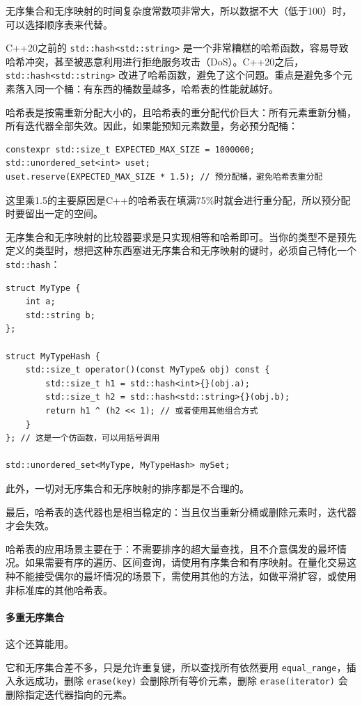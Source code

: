 无序集合和无序映射的时间复杂度常数项非常大，所以数据不大（低于100）时，可以选择顺序表来代替。

C++20之前的 \verb|std::hash<std::string>| 是一个非常糟糕的哈希函数，容易导致哈希冲突，甚至被恶意利用进行拒绝服务攻击（DoS）。C++20之后，\verb|std::hash<std::string>| 改进了哈希函数，避免了这个问题。重点是避免多个元素落入同一个桶：有东西的桶数量越多，哈希表的性能就越好。

哈希表是按需重新分配大小的，且哈希表的重分配代价巨大：所有元素重新分桶，所有迭代器全部失效。因此，如果能预知元素数量，务必预分配桶：
\begin{verbatim}
constexpr std::size_t EXPECTED_MAX_SIZE = 1000000;
std::unordered_set<int> uset;
uset.reserve(EXPECTED_MAX_SIZE * 1.5); // 预分配桶，避免哈希表重分配
\end{verbatim}
这里乘1.5的主要原因是C++的哈希表在填满75\%时就会进行重分配，所以预分配时要留出一定的空间。

无序集合和无序映射的比较器要求是只实现相等和哈希即可。当你的类型不是预先定义的类型时，想把这种东西塞进无序集合和无序映射的键时，必须自己特化一个 \verb|std::hash|：
\begin{verbatim}
struct MyType {
    int a;
    std::string b;
};

struct MyTypeHash {
    std::size_t operator()(const MyType& obj) const {
        std::size_t h1 = std::hash<int>{}(obj.a);
        std::size_t h2 = std::hash<std::string>{}(obj.b);
        return h1 ^ (h2 << 1); // 或者使用其他组合方式
    }
}; // 这是一个仿函数，可以用括号调用

std::unordered_set<MyType, MyTypeHash> mySet;
\end{verbatim}
此外，一切对无序集合和无序映射的排序都是不合理的。

最后，哈希表的迭代器也是相当稳定的：当且仅当重新分桶或删除元素时，迭代器才会失效。

哈希表的应用场景主要在于：不需要排序的超大量查找，且不介意偶发的最坏情况。如果需要有序的遍历、区间查询，请使用有序集合和有序映射。在量化交易这种不能接受偶尔的最坏情况的场景下，需使用其他的方法，如做平滑扩容，或使用非标准库的其他哈希表。

\paragraph{多重无序集合} 这个还算能用。

它和无序集合差不多，只是允许重复键，所以查找所有依然要用 \verb|equal_range|，插入永远成功，删除 \verb|erase(key)| 会删除所有等价元素，删除 \verb|erase(iterator)| 会删除指定迭代器指向的元素。

